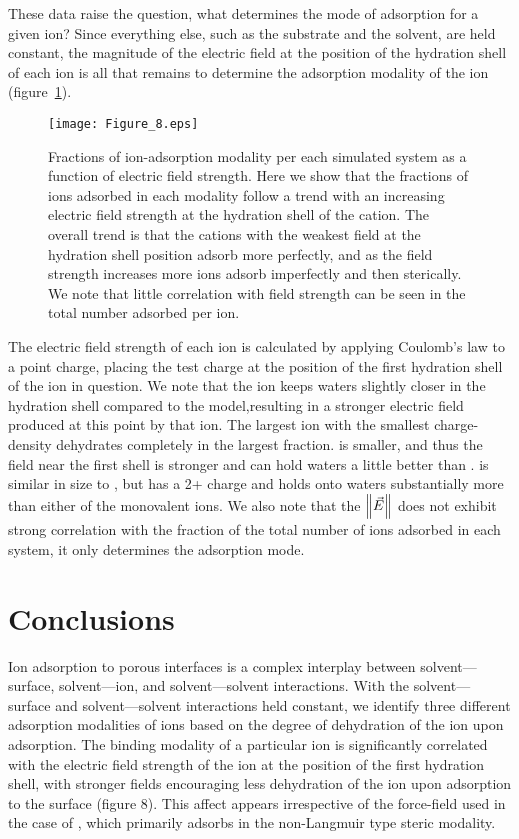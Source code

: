 These data raise the question, what determines the mode of adsorption for a given ion? Since everything else, such as
the substrate and the solvent, are held constant, the magnitude of the electric field at the position of the hydration shell
of each ion is all that remains to determine the adsorption modality of the ion (figure~\ref{figch3:cationfrac}).
\begin{figure}[H]
    \caption[Fractions of ion-adsorption modalities]{Fractions of ion-adsorption modality per each simulated system as a function of electric field strength. Here we 
    show that the fractions of ions adsorbed in each modality follow a trend with an increasing electric field strength at the
    hydration shell of the cation. The overall trend is that the cations with the weakest field at the hydration shell position
    adsorb more perfectly, and as the field strength increases more ions adsorb imperfectly and then sterically. We note
    that little correlation with field strength can be seen in the total number adsorbed per ion.}
    \label{figch3:cationfrac}
    \texttt{[image: Figure\_8.eps]}
\end{figure}
The electric field strength of each ion is calculated by applying Coulomb's law to a point charge, placing the test charge at the 
position of the first hydration shell of the ion in question. We note that the \mgmbnbfix ion keeps waters slightly closer in the hydration shell
compared to the \mgmicro model{,}{resulting in} a stronger electric field 
produced at this point by that ion.
The largest ion with the smallest charge-density \na dehydrates completely in the largest fraction. \li{} is smaller, and thus the field near
the first shell is stronger and can hold waters a little better than \na. \mg is similar in size to \li{}, but has a 2+ charge and
holds onto waters substantially more than either of the monovalent ions.  
We also note that the $\left\lVert\vec{E}\right\rVert$ does not exhibit strong correlation with the fraction of the total number of ions adsorbed in each system, it
only determines the adsorption mode. 

\section{Conclusions}
Ion adsorption to porous interfaces is a complex interplay 
between solvent---surface, solvent---ion, and solvent---solvent
interactions. With the solvent---surface and solvent---solvent interactions 
held constant, we identify
three different adsorption modalities of ions based on the degree of 
dehydration of the ion upon adsorption. 
The binding modality of a particular ion is significantly correlated 
with the electric field strength of the ion
at the position of the first hydration shell, with stronger fields 
encouraging less dehydration of the ion upon
adsorption to the surface {(figure 8)}. This affect appears irrespective of the force-field 
used in the case
of \mg{}, which primarily adsorbs in the non-Langmuir type steric modality.


